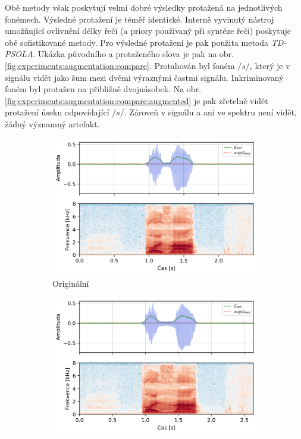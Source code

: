 Obě metody však poskytují velmi dobré výsledky protažená na jednotlivých fonémech. Výsledné protažení je téměř identické. Interně vyvinutý nástroj umožňující ovlivnění délky řeči (a priory používaný při syntéze řeči) poskytuje obě sofistikované metody. Pro výsledné protažení je pak použita metoda \textit{TD-PSOLA}. Ukázka původního a protaženého slova  je pak na obr. \ref{fig:experiments:augmentation:compare}. Protahován byl foném $/s/$, který je v signálu vidět jako šum mezi dvěmi výraznými častmi signálu. Inkriminovaný foném byl protažen na přibližně dvojnásobek. Na obr. \ref{fig:experiments:augmentation:compare:augmented} je pak zřetelně vidět protažení úseku odpovídající $/s/$. Zároveň v signálu a ani ve spektru není vidět, žádný významný artefakt.

\begin{figure}[htpb]
  \centering
  \begin{subfigure}[b]{0.42\textwidth}
    \includegraphics[width=\textwidth]{./ch5-construction/img/energy_spec_word-normal.png}
    \caption{Originální}
    \label{fig:experiments:augmentation:compare:original}
  \end{subfigure}
  \begin{subfigure}[b]{0.42\textwidth}
    \includegraphics[width=\textwidth]{./ch5-construction/img/energy_spec_word-augmented.png}

\end{subfigure}
\end{figure}
